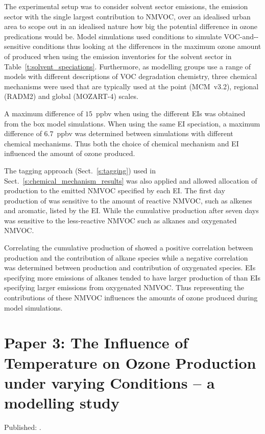 The experimental setup was to consider solvent sector emissions, the emission sector with the single largest contribution to NMVOC, over an idealised urban area to scope out in an idealised nature how big the potential difference in ozone predications would be.
Model simulations used  conditions to simulate VOC-and--sensitive conditions thus looking at the differences in the maximum ozone amount of produced when using the emission inventories for the solvent sector in Table~\ref{t:solvent_speciations}.
Furthermore, as modelling groups use a range of models with different descriptions of VOC degradation chemistry, three chemical mechanisms were used that are typically used at the point (MCM~v3.2), regional (RADM2) and global (MOZART-4) scales.

A maximum difference of $15$~ppbv when using the different EIs was obtained from the box model simulations.
When using the same EI speciation, a maximum difference of $6.7$~ppbv was determined between simulations with different chemical mechanisms.
Thus both the choice of chemical mechanism and EI influenced the amount of ozone produced.

The tagging approach (Sect.~\ref{s:tagging}) used in Sect.~\ref{s:chemical_mechanism_results} was also applied and allowed allocation of  production to the emitted NMVOC specified by each EI.
The first day production of  was sensitive to the amount of reactive NMVOC, such as alkenes and aromatic, listed by the EI.
While the cumulative  production after seven days was sensitive to the less-reactive NMVOC such as alkanes and oxygenated NMVOC.

Correlating the cumulative production of  showed a positive correlation between  production and the contribution of alkane species while a negative correlation was determined between  production and contribution of oxygenated species.
EIs specifying more emissions of alkanes tended to have larger production of  than EIs specifying larger emissions from oxygenated NMVOC.
Thus representing the contributions of these NMVOC influences the amounts of ozone produced during model simulations.

\singlespacing
\section[Paper 3]{Paper 3: The Influence of Temperature on Ozone Production under varying  Conditions -- a modelling study} \label{s:T-O3_results}
\onehalfspacing

Published: .
\vspace{5mm}

